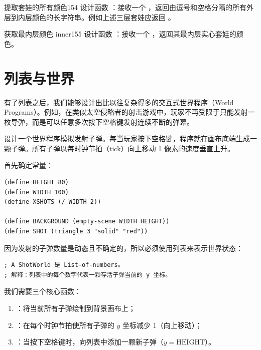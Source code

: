 \begin{exercise}{提取套娃的所有颜色}{154}
设计函数 ：接收一个 ，返回由逗号和空格分隔的所有外层到内层颜色的长字符串。例如上述三层套娃应返回 。
\end{exercise}

\begin{exercise}{获取最内层颜色 inner}{155}
设计函数 ：接收一个 ，返回其最内层实心套娃的颜色。
\end{exercise}

\section{列表与世界}
\label{sec:ch09_lists_and_world}

有了列表之后，我们能够设计出比以往复杂得多的交互式世界程序（World Programs）。例如，在类似太空侵略者的射击游戏中，玩家不再受限于只能发射一枚导弹，而是可以任意多次按下空格键发射连续不断的弹幕。

\begin{notebox}
设计一个世界程序模拟发射子弹。每当玩家按下空格键，程序就在画布底端生成一颗子弹。所有子弹以每时钟节拍（tick）向上移动 1 像素的速度垂直上升。
\end{notebox}

首先确定常量：
\begin{lstlisting}[language=BSL]
(define HEIGHT 80)
(define WIDTH 100)
(define XSHOTS (/ WIDTH 2))

(define BACKGROUND (empty-scene WIDTH HEIGHT))
(define SHOT (triangle 3 "solid" "red"))
\end{lstlisting}

因为发射的子弹数量是动态且不确定的，所以必须使用列表来表示世界状态：
\begin{lstlisting}[language=BSL]
; A ShotWorld 是 List-of-numbers。
; 解释：列表中的每个数字代表一颗存活子弹当前的 y 坐标。
\end{lstlisting}

我们需要三个核心函数：
\begin{enumerate}
  \item {}：将当前所有子弹绘制到背景画布上；
  \item {}：在每个时钟节拍使所有子弹的 $y$ 坐标减少 1（向上移动）；
  \item {}：当按下空格键时，向列表中添加一颗新子弹（$y = \text{HEIGHT}$）。
\end{enumerate}

